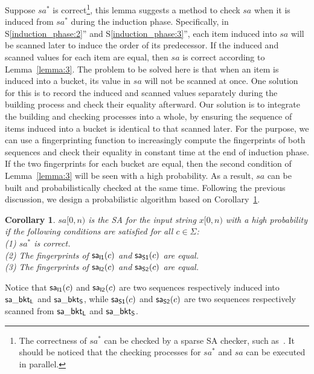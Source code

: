 \documentclass[10pt,journal,compsoc]{IEEEtran}
\newtheorem{corollary}[theorem]{Corollary}
\begin{document}
Suppose $sa^*$ is correct\footnote{The correctness of $sa^*$ can be checked by a sparse SA checker, such as~\cite{wu2017}. It should be noticed that the checking processes for $sa^*$ and $sa$ can be executed in parallel.}, this lemma suggests a method to check $sa$ when it is induced from $sa^*$ during the induction phase. Specifically, in S\ref{induction_phase:2}'' and S\ref{induction_phase:3}'', each item induced into $sa$ will be scanned later to induce the order of its predecessor. If the induced and scanned values for each item are equal, then $sa$ is correct according to Lemma~\ref{lemma:3}. The problem to be solved here is that when an item is induced into a bucket, its value in $sa$ will not be scanned at once. One solution for this is to record the induced and scanned values separately during the building process and check their equality afterward. Our solution is to integrate the building and checking processes into a whole, by ensuring the sequence of items induced into a bucket is identical to that scanned later. For the purpose, we can use a fingerprinting function to increasingly compute the fingerprints of both sequences and check their equality in constant time at the end of induction phase. If the two fingerprints for each bucket are equal, then the second condition of Lemma~\ref{lemma:3} will be seen with a high probability. As a result, $sa$ can be built and probabilistically checked at the same time. Following the previous discussion, we design a probabilistic algorithm based on  Corollary~\ref{corollary:1}.
	
\begin{corollary} \label{corollary:1}
	$sa[0, n)$ is the SA for the input string $x[0, n)$ with a high probability if the following conditions are satisfied for all $c \in \Sigma$: \\
	(1) $sa^*$ is correct.\\
	(2) The fingerprints of ${\sf sa_{I1}}(c)$ and ${\sf sa_{S1}}(c)$ are equal. \\
	(3) The fingerprints of ${\sf sa_{I2}}(c)$ and ${\sf sa_{S2}}(c)$ are equal. \\
	
\end{corollary}

Notice that ${\sf sa_{I1}}(c)$ and ${\sf sa_{I2}}(c)$ are two sequences respectively induced into ${\sf sa\_bkt_L}$ and ${\sf sa\_bkt_S}$, while ${\sf sa_{S1}}(c)$ and ${\sf sa_{S2}}(c)$ are two sequences respectively scanned from ${\sf sa\_bkt_L}$ and ${\sf sa\_bkt_S}$. 
\end{document}
